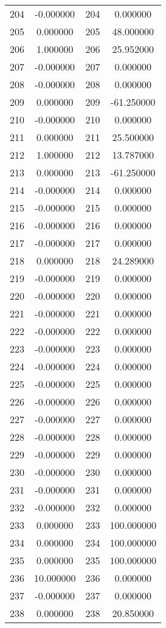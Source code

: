 \documentclass[12pt]{article}
\begin{document}
\begin{longtable}{@{}cccc@{}}
204 & -0.000000 & 204 & 0.000000 \\
205 & 0.000000 & 205 & 48.000000 \\
206 & 1.000000 & 206 & 25.952000 \\
207 & -0.000000 & 207 & 0.000000 \\
208 & -0.000000 & 208 & 0.000000 \\
209 & 0.000000 & 209 & -61.250000 \\
210 & -0.000000 & 210 & 0.000000 \\
211 & 0.000000 & 211 & 25.500000 \\
212 & 1.000000 & 212 & 13.787000 \\
213 & 0.000000 & 213 & -61.250000 \\
214 & -0.000000 & 214 & 0.000000 \\
215 & -0.000000 & 215 & 0.000000 \\
216 & -0.000000 & 216 & 0.000000 \\
217 & -0.000000 & 217 & 0.000000 \\
218 & 0.000000 & 218 & 24.289000 \\
219 & -0.000000 & 219 & 0.000000 \\
220 & -0.000000 & 220 & 0.000000 \\
221 & -0.000000 & 221 & 0.000000 \\
222 & -0.000000 & 222 & 0.000000 \\
223 & -0.000000 & 223 & 0.000000 \\
224 & -0.000000 & 224 & 0.000000 \\
225 & -0.000000 & 225 & 0.000000 \\
226 & -0.000000 & 226 & 0.000000 \\
227 & -0.000000 & 227 & 0.000000 \\
228 & -0.000000 & 228 & 0.000000 \\
229 & -0.000000 & 229 & 0.000000 \\
230 & -0.000000 & 230 & 0.000000 \\
231 & -0.000000 & 231 & 0.000000 \\
232 & -0.000000 & 232 & 0.000000 \\
233 & 0.000000 & 233 & 100.000000 \\
234 & 0.000000 & 234 & 100.000000 \\
235 & 0.000000 & 235 & 100.000000 \\
236 & 10.000000 & 236 & 0.000000 \\
237 & -0.000000 & 237 & 0.000000 \\
238 & 0.000000 & 238 & 20.850000 \\

\end{longtable}
\end{document}
